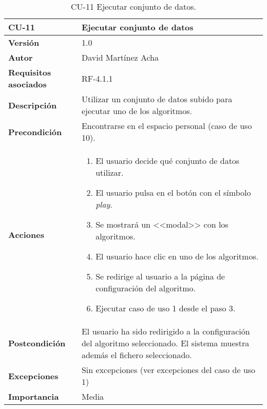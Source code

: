 \begin{table}[p]
	\centering
	\begin{tabularx}{\linewidth}{ p{} p{} }
		\toprule
		\textbf{CU-11}    & \textbf{Ejecutar conjunto de datos}\\
		\toprule
		\textbf{Versión}              & 1.0    \\
		\textbf{Autor}                & David Martínez Acha \\
		\textbf{Requisitos asociados} & RF-4.1.1 \\
		\textbf{Descripción}          & Utilizar un conjunto de datos subido para ejecutar uno de los algoritmos. \\
		\textbf{Precondición}         & Encontrarse en el espacio personal (caso de uso 10). \\
		\textbf{Acciones}             &
		\begin{enumerate}
			\def\labelenumi{\arabic{enumi}.}
			\tightlist
			\item El usuario decide qué conjunto de datos utilizar.
			\item El usuario pulsa en el botón con el símbolo \textit{play}.
			\item Se mostrará un <<modal>> con los algoritmos.
			\item El usuario hace clic en uno de los algoritmos.
			\item Se redirige al usuario a la página de configuración del algoritmo.
			\item Ejecutar caso de uso 1 desde el paso 3.
		\end{enumerate}\\
		\textbf{Postcondición}        & El usuario ha sido redirigido a la configuración del algoritmo seleccionado. El sistema muestra además el fichero seleccionado. \\
		\textbf{Excepciones}          & Sin excepciones (ver excepciones del caso de uso 1)\\
		\textbf{Importancia}          & Media \\
		\bottomrule
	\end{tabularx}
	\caption{CU-11 Ejecutar conjunto de datos.}
\end{table}

